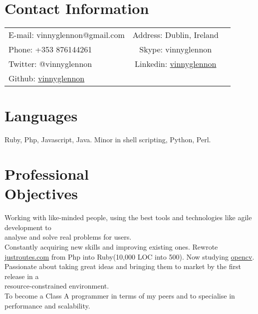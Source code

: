 \documentclass[margin,line]{resume}
\begin{document}
\begin{resume}

    \section{\mysidestyle Contact Information}

    \begin{tabular}{ l c l}
    E-mail: vinnyglennon@gmail.com & Address: Dublin, Ireland\\
    Phone: +353 876144261 & Skype: vinnyglennon\\
    Twitter: @vinnyglennon & Linkedin: \href{http://ie.linkedin.com/in/vinnyglennon}{vinnyglennon}\\
    Github: \href{https://github.com/vinnyglennon}{vinnyglennon} \\
    \end{tabular}

    \section{\mysidestyle Languages}

    Ruby, Php, Javascript, Java. Minor in shell scripting, Python, Perl.

    \section{\mysidestyle Professional \\ Objectives}

    Working with like-minded people, using the best tools and technologies like agile development to \\analyse and solve real problems for users.\vspace{1mm}\\%
    Constantly acquiring new skills and improving existing ones. Rewrote \href{http://justroutes.com}{justroutes.com} from Php into Ruby(10,000 LOC into 500). Now studying \href{http://opencv.willowgarage.com/wiki/}{opencv}.\\%
    Passionate about taking great ideas and bringing them to market by the first release in a \\resource-constrained environment.\vspace{1mm}\\%
    To become a Class A programmer in terms of my peers and to specialise in performance and scalability.
    

\end{resume}
\end{document}
